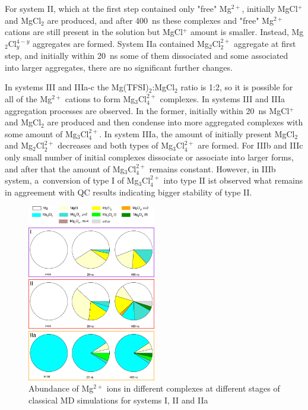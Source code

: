 For system II, which at the first step contained only "free" Mg$^{2+}$, initially MgCl$^{+}$ and MgCl$_2$ are produced, and after 400~ns these complexes and "free" Mg$^{2+}$ cations are still present in the solution but MgCl$^{+}$ amount is smaller. Instead, Mg$_2$Cl$_y^{4-y}$ aggregates are formed. System IIa contained Mg$_2$Cl$_2^{2+}$ aggregate at first step, and initially within 20~ns some of them dissociated and some associated into larger aggregates, there are no significant further changes.

In systems III and IIIa-c the Mg(TFSI)$_2$:MgCl$_2$ ratio is 1:2, so it is possible for all of the Mg$^{2+}$ cations to form Mg$_3$Cl$_4^{2+}$ complexes. In systems III and IIIa aggregation processes are observed. In the former, initially within 20~ns MgCl$^{+}$ and MgCl$_2$ are produced and then condense into more aggregated complexes with some amount of Mg$_3$Cl$_4^{2+}$. In system IIIa, the amount of initially present MgCl$_2$ and Mg$_2$Cl$_2^{2+}$ decreases and both types of Mg$_3$Cl$_4^{2+}$ are formed. For IIIb and IIIc only small number of initial complexes dissociate or associate into larger forms, and after that the amount of Mg$_3$Cl$_4^{2+}$ remains constant. However, in IIIb system, a~conversion of type I of Mg$_3$Cl$_4^{2+}$ into type II ist observed what remains in aggreement with QC results indicating bigger stability of type II.

\begin{figure}[H]
    \centering
    \includegraphics[width=0.5\textwidth]{img/3-structural-data-from-md-simulations/3-mg-cl-dme/speciation-1.png}
    \singlespacing
    \caption{Abundance of Mg$^{2+}$ ions in different complexes at different stages of classical MD simulations for systems I, II and IIa}
    \label{fig:mg-cl-dme-speciation-1}
\end{figure}

